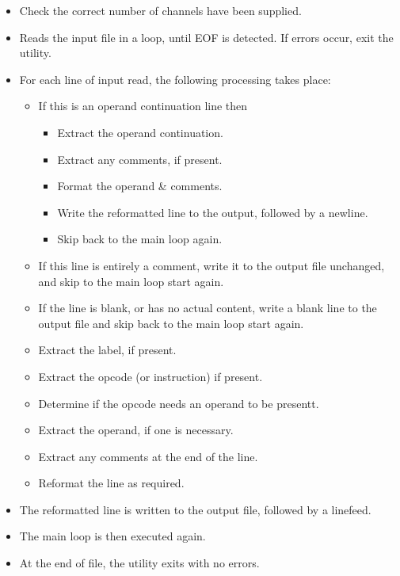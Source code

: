 \begin{itemize}
	\item Check the correct number of channels have been supplied.
	\item Reads the input file in a loop, until EOF is detected. If errors occur, exit the utility. 
	\item For each line of input read, the following processing takes place:

	\begin{itemize}
		\item If this is an operand continuation line then
		
		\begin{itemize}
			\item Extract the operand continuation.
			\item Extract any comments, if present.
			\item Format the operand \& comments.
			\item Write the reformatted line to the output, followed by a newline.
			\item Skip back to the main loop again.
		\end{itemize}
		
		\item If this line is entirely a comment, write it to the output file unchanged, and skip to the main loop start again.
		\item If the line is blank, or has no actual content, write a blank line to the output file and skip back to the main loop start again.
		\item Extract the label, if present.
		\item Extract the opcode (or instruction) if present.
		\item Determine if the opcode needs an operand to be presentt.
		\item Extract the operand, if one is necessary.
		\item Extract any comments at the end of the line.
		\item Reformat the line as required.		
	\end{itemize}
	
	\item The reformatted line is written to the output file, followed by a linefeed.
	\item The main loop is then executed again.
	\item At the end of file, the utility exits with no errors.	
\end{itemize}

